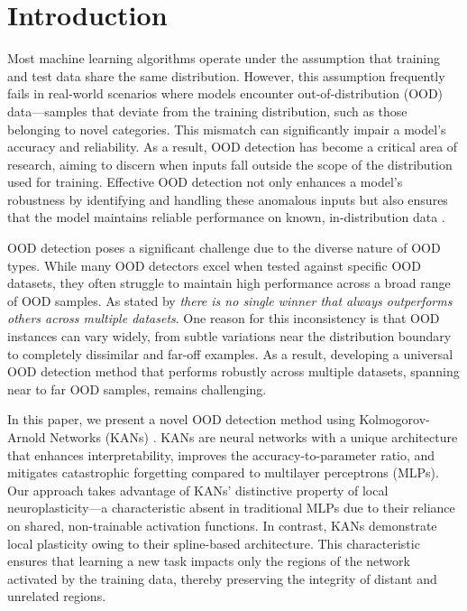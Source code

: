 \section{Introduction}

Most machine learning algorithms operate under the assumption that training and test data share the same distribution. 
However, this assumption frequently fails in real-world scenarios where models encounter out-of-distribution (OOD) data—samples that deviate from the training distribution, such as those belonging to novel categories.
This mismatch can significantly impair a model's accuracy and reliability. 
As a result, OOD detection has become a critical area of research, aiming to discern when inputs fall outside the scope of the distribution used for training. 
Effective OOD detection not only enhances a model’s robustness by identifying and handling these anomalous inputs but also ensures that the model maintains reliable performance on known, in-distribution data \citep{NEURIPS2022_d201587e}.

OOD detection poses a significant challenge due to the diverse nature of OOD types. 
While many OOD detectors excel when tested against specific OOD datasets, they often struggle to maintain high performance across a broad range of OOD samples. 
As stated by \citet{zhang2023openood} \textit{there is no single winner that always outperforms others across multiple datasets}. 
One reason for this inconsistency is that OOD instances can vary widely, from subtle variations near the distribution boundary to completely dissimilar and far-off examples. 
As a result, developing a universal OOD detection method that performs robustly across multiple datasets, spanning near to far OOD samples, remains challenging.

In this paper, we present a novel OOD detection method using Kolmogorov-Arnold Networks (KANs) \citep{liu2024kankolmogorovarnoldnetworks}.
KANs are neural networks with a unique architecture that enhances interpretability, improves the accuracy-to-parameter ratio, and mitigates catastrophic forgetting compared to multilayer perceptrons (MLPs).
Our approach takes advantage of KANs' distinctive property of local neuroplasticity—a characteristic absent in traditional MLPs due to their reliance on shared, non-trainable activation functions.
In contrast, KANs demonstrate local plasticity owing to their spline-based architecture. 
This characteristic ensures that learning a new task impacts only the regions of the network activated by the training data, thereby preserving the integrity of distant and unrelated regions.

